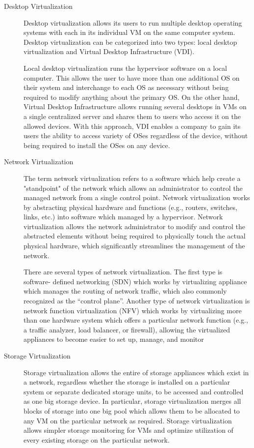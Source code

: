 \documentclass[../index.tex]{subfiles}
\begin{document}
\begin{description}

  \item[Desktop Virtualization] Desktop virtualization allows its users to run multiple desktop
    operating systems with each in its individual VM on the same computer system. Desktop
    virtualization can be categorized into two types: local desktop virtualization and Virtual
    Desktop Infrastructure (VDI).

    Local desktop virtualization runs the hypervisor software on a local computer. This allows the
    user to have more than one additional OS on their system and interchange to each OS as necessary
    without being required to modify anything about the primary OS. On the other hand, Virtual
    Desktop Infrastructure allows running several desktops in VMs on a single centralized server and
    shares them to users who access it on the allowed devices. With this approach, VDI enables a
    company to gain its users the ability to access variety of OSes regardless of the device,
    without being required to install the OSes on any device.

  \item[Network Virtualization] The term network virtualization refers to a software which help
    create a "standpoint" of the network which allows an administrator to control the managed
    network from a single control point. Network virtualization works by abstracting physical
    hardware and functions (e.g., routers, switches, links, etc.) into software which managed by a
    hypervisor. Network virtualization allows the network administrator to modify and control the
    abstracted elements without being required to physically touch the actual physical hardware,
    which significantly streamlines the management of the network.

    There are several types of network virtualization. The first type is software- defined
    networking (SDN) which works by virtualizing appliance which manages the routing of network
    traffic, which also commonly recognized as the “control plane”. Another type of network
    virtualization is network function virtualization (NFV) which works by virtualizing more than
    one hardware system which offers a particular network function (e.g., a traffic analyzer, load
    balancer, or firewall), allowing the virtualized appliances to become easier to set up, manage,
    and monitor

  \item[Storage Virtualization] Storage virtualization allows the entire of storage appliances which
    exist in a network, regardless whether the storage is installed on a particular system or
    separate dedicated storage units, to be accessed and controlled as one big storage device. In
    particular, storage virtualization merges all blocks of storage into one big pool which allows
    them to be allocated to any VM on the particular network as required. Storage virtualization
    allows simpler storage monitoring for VMs and optimize utilization of every existing storage on
    the particular network.


\end{description}
\end{document}
